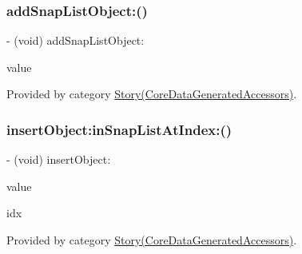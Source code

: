 \hypertarget{interface_story_a34b377739386181624777fb994e5b02e}{}\label{interface_story_a34b377739386181624777fb994e5b02e} 
\subsubsection{\texorpdfstring{add\+Snap\+List\+Object\+:()}{addSnapListObject:()}}
{\footnotesize\ttfamily -\/ (void) add\+Snap\+List\+Object\+: \begin{DoxyParamCaption}\item[{(\hyperlink{interface_snap}{Snap} $\ast$)}]{value }\end{DoxyParamCaption}}



Provided by category \hyperlink{category_story_07_core_data_generated_accessors_08_a34b377739386181624777fb994e5b02e}{Story(\+Core\+Data\+Generated\+Accessors)}.

\hypertarget{interface_story_ac7aaa8d738a55d8f7cb8fd0c26fd4b70}{}\label{interface_story_ac7aaa8d738a55d8f7cb8fd0c26fd4b70} 
\subsubsection{\texorpdfstring{insert\+Object\+:in\+Snap\+List\+At\+Index\+:()}{insertObject:inSnapListAtIndex:()}}
{\footnotesize\ttfamily -\/ (void) insert\+Object\+: \begin{DoxyParamCaption}\item[{(\hyperlink{interface_snap}{Snap} $\ast$)}]{value }\item[{inSnapListAtIndex:(N\+S\+U\+Integer)}]{idx }\end{DoxyParamCaption}}



Provided by category \hyperlink{category_story_07_core_data_generated_accessors_08_ac7aaa8d738a55d8f7cb8fd0c26fd4b70}{Story(\+Core\+Data\+Generated\+Accessors)}.

\hypertarget{interface_story_a26833828ef49f8ccd8731b7b2a276650}{}\label{interface_story_a26833828ef49f8ccd8731b7b2a276650} 
